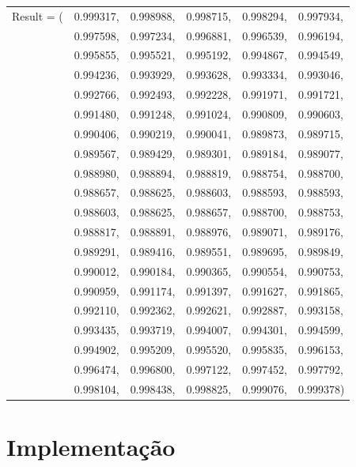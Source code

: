 \documentclass[12pt,a4paper]{article}
\begin{document}
\begin{table}[!ht]
    \centering
    \begin{tabular}{llllll}
        Result = (& 0.999317, & 0.998988, & 0.998715, & 0.998294, & 0.997934,
        \\ & 0.997598, & 0.997234, & 0.996881, & 0.996539, & 0.996194,
        \\ & 0.995855, & 0.995521, & 0.995192, & 0.994867, & 0.994549,
        \\ & 0.994236, & 0.993929, & 0.993628, & 0.993334, & 0.993046,
        \\ & 0.992766, & 0.992493, & 0.992228, & 0.991971, & 0.991721,
        \\ & 0.991480, & 0.991248, & 0.991024, & 0.990809, & 0.990603,
        \\ & 0.990406, & 0.990219, & 0.990041, & 0.989873, & 0.989715, 
        \\ & 0.989567, & 0.989429, & 0.989301, & 0.989184, & 0.989077, 
        \\ & 0.988980, & 0.988894, & 0.988819, & 0.988754, & 0.988700, 
        \\ & 0.988657, & 0.988625, & 0.988603, & 0.988593, & 0.988593, 
        \\ & 0.988603, & 0.988625, & 0.988657, & 0.988700, & 0.988753, 
        \\ & 0.988817, & 0.988891, & 0.988976, & 0.989071, & 0.989176, 
        \\ & 0.989291, & 0.989416, & 0.989551, & 0.989695, & 0.989849, 
        \\ & 0.990012, & 0.990184, & 0.990365, & 0.990554, & 0.990753, 
        \\ & 0.990959, & 0.991174, & 0.991397, & 0.991627, & 0.991865, 
        \\ & 0.992110, & 0.992362, & 0.992621, & 0.992887, & 0.993158, 
        \\ & 0.993435, & 0.993719, & 0.994007, & 0.994301, & 0.994599, 
        \\ & 0.994902, & 0.995209, & 0.995520, & 0.995835, & 0.996153, 
        \\ & 0.996474, & 0.996800, & 0.997122, & 0.997452, & 0.997792, 
        \\ & 0.998104, & 0.998438, & 0.998825, & 0.999076, & 0.999378)
    \end{tabular}
\end{table}{}


\section{Implementação}
\end{document}
